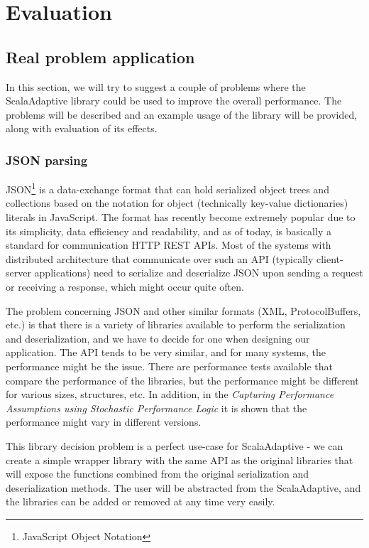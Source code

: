 \chapter{Evaluation}

\section{Real problem application}

In this section, we will try to suggest a couple of problems where the ScalaAdaptive library could be used to improve the overall performance. The problems will be described and an example usage of the library will be provided, along with evaluation of its effects.

\subsection{JSON parsing}

JSON\footnote{JavaScript Object Notation} is a data-exchange format that can hold serialized object trees and collections based on the notation for object (technically key-value dictionaries) literals in JavaScript. The format has recently become extremely popular due to its simplicity, data efficiency and readability, and as of today, is basically a standard for communication HTTP REST APIs. Most of the systems with distributed architecture that communicate over such an API (typically client-server applications) need to serialize and deserialize JSON upon sending a request or receiving a response, which might occur quite often.


The problem concerning JSON and other similar formats (XML, ProtocolBuffers, etc.) is that there is a variety of libraries available to perform the serialization and deserialization, and we have to decide for one when designing our application. The API tends to be very similar, and for many systems, the performance might be the issue. There are performance tests available that compare the performance of the libraries, but the performance might be different for various sizes, structures, etc. In addition, in the \textit{Capturing Performance Assumptions using Stochastic Performance Logic} it is shown that the performance might vary in different versions.

This library decision problem is a perfect use-case for ScalaAdaptive - we can create a simple wrapper library with the same API as the original libraries that will expose the functions combined from the original serialization and deserialization methods. The user will be abstracted from the ScalaAdaptive, and the libraries can be added or removed at any time very easily.

